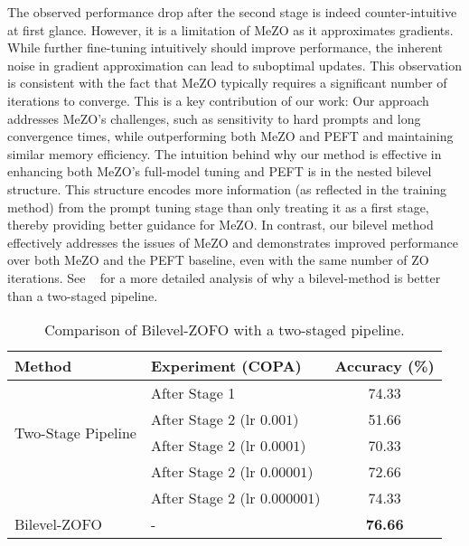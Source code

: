 The observed performance drop after the second stage is indeed counter-intuitive at first glance. However, it is a limitation of MeZO as it approximates gradients. While further fine-tuning intuitively should improve performance, the inherent noise in gradient approximation can lead to suboptimal updates. This observation is consistent with the fact that MeZO typically requires a significant number of iterations to converge. This is a key contribution of our work: Our approach addresses MeZO's challenges, such as sensitivity to hard prompts and long convergence times, while outperforming both MeZO and PEFT and maintaining similar memory efficiency. The intuition behind why our method is effective in enhancing both MeZO's full-model tuning and PEFT is in the nested bilevel structure. This structure encodes more information (as reflected in the training method) from the prompt tuning stage than only treating it as a first stage, thereby providing better guidance for MeZO. In contrast, our bilevel method effectively addresses the issues of MeZO and demonstrates improved performance over both MeZO and the PEFT baseline, even with the same number of ZO iterations.
See ~\cite{shirkavand2024efficient} for a more detailed analysis of why a bilevel-method is better than a two-staged pipeline.


\begin{table}
\centering
\begin{tabular}{llc}
\hline
\textbf{Method}         & \textbf{Experiment (COPA)} & \textbf{Accuracy (\%)} \\ \hline
\multirow{4}{*}{Two-Stage Pipeline}   & After Stage 1              & 74.33                                   \\ 
                        & After Stage 2 (lr $0.001$)               & 51.66                         \\ 
                        & After Stage 2 (lr $0.0001$)               & 70.33                          \\ 
                        & After Stage 2 (lr $0.00001$)               & 72.66                      \\ 
                        & After Stage 2 (lr $0.000001$)               & 74.33                         \\ \hline
Bilevel-ZOFO &   -      & \textbf{76.66}  \\ \hline
\end{tabular}
\caption{Comparison of Bilevel-ZOFO with a two-staged pipeline.}
\label{tab:two-stage-comparison}
\end{table}

